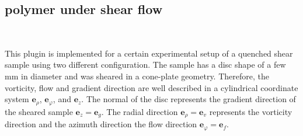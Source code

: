 \newpage
\subsection{polymer under shear flow}~\\
\label{sect:PolymerShearFlow}

This plugin is implemented for a certain experimental setup of a quenched shear sample using two different configuration. The sample has a disc shape of a few mm in diameter and was sheared in a cone-plate geometry. Therefore, the vorticity, flow and gradient direction are well described in a cylindrical coordinate system $\mathbf{e}_\rho$, $\mathbf{e}_\varphi$, and $\mathbf{e}_z$. The normal of the disc represents the gradient direction of the sheared sample $\mathbf{e}_z=\mathbf{e}_g$. The radial direction $\mathbf{e}_\rho=\mathbf{e}_v$ represents the vorticity direction and the azimuth direction the flow direction $\mathbf{e}_\varphi=\mathbf{e}_f$.

